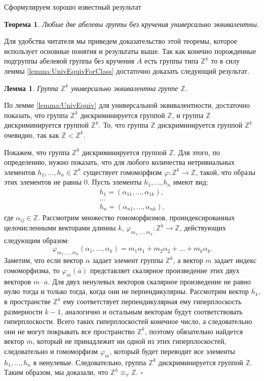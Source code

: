 \documentclass[a4paper,11pt,twoside]{article}
\newtheorem{theorem}{Теорема}[section]
\newtheorem{lemma}{Лемма}[section]
\def\proof{{\noindent{\bf Доказательство.}} }
\def\Z{{\mathbb{Z}}}
\begin{document}
Сформулируем хорошо известный результат

\begin{theorem}\label{th:AbelUnivEquiv}
Любые две абелевы группы без кручения универсально эквивалентны.
\end{theorem}

Для удобства читателя мы приведем доказательство этой теоремы, которое использует основные понятия и результаты выше. Так как конечно порожденные подгруппы абелевой группы без кручения $A$ есть группы типа $\Z^k$ то в силу леммы \ref{lemma:UnivEquivForClass} достаточно доказать следующий результат.

\begin{lemma}\label{lemma:UnivEquivZk}
Группа $\Z^k$ универсально эквивалентна группе $\Z$.
\end{lemma}

\proof По лемме \ref{lemma:UnivEquiv} для универсальной эквивалентности, достаточно показать, что группа $\Z^k$ дискриминируется группой $\Z$, и группа $\Z$ дискриминируется группой $\Z^k$. То, что группа $\Z$ дискриминируется группой $\Z^k$ очевидно, так как $\Z < \Z^k$. 

Покажем, что группа $\Z^k$ дискриминируется группой $\Z$. Для этого, по определению, нужно показать, что для любого количества нетривиальных элементов $h_1, \ldots, h_n \in \Z^k$ существует гомоморфизм $\varphi : \Z^k \rightarrow \Z$, такой, что образы этих элементов не равны 0. Пусть элементы $h_1, \ldots, h_n$ имеют вид:
$$\begin{array}{c}
 h_1 = (\alpha_{11}, \ldots, \alpha_{1k}), \\
 \ldots \\
 h_n = (\alpha_{n1}, \ldots, \alpha_{nk}),
 \end{array} $$
где $\alpha_{ij} \in \Z$. Рассмотрим множество гомоморфизмов, проиндексированных целочисленными векторами длинны $k$, $\varphi_{m_1,\ldots,m_k} : \Z^k \rightarrow \Z$, действующих следующим образом:
$$\varphi_{m_1,\ldots,m_k} (\alpha_1, \ldots, \alpha_k) = m_1 \alpha_1 + m_2 \alpha_2 + \ldots + m_k \alpha_k.$$
Заметим, что если вектор $\overline{\alpha}$ задает элемент группы $\Z^k$, а вектор $\overline{m}$ задает индекс гомоморфизма, то $\varphi_{\overline{m}}(\overline{a})$ представляет скалярное произведение этих двух векторов $\overline{m} \cdot \overline{a}$. Для двух ненулевых векторов скалярное произведение не равно нулю тогда и только тогда, когда они не перпендикулярны. Рассмотрим вектор $\overline{h_1}$, в пространстве $\Z^k$ ему соответствует перпендикулярная ему гиперплоскость размерности $k-1$, аналогично и остальным векторам будут соответствовать гиперплоскости. Всего таких гиперплоскостей конечное число, а следовательно они не могут покрывать все пространство $\Z^k$, поэтому обязательно найдется вектор $\overline{m}$, который не принадлежит ни одной из этих гиперплоскостей, следовательно и гомоморфизм $\varphi_{\overline{m}}$, который будет переводит все элементы $h_1,\ldots, h_n$ в ненулевые. Следовательно, группа $\Z^k$ дискриминируется группой $\Z$. Таким образом, мы доказали, что $\Z^k \equiv_{\forall} \Z$. $\square$
\end{document}

